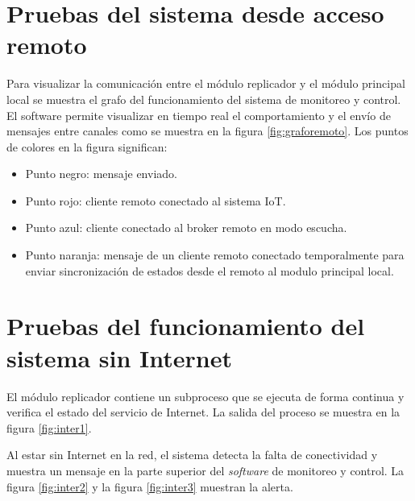 \section{Pruebas del sistema desde acceso remoto}

Para visualizar la comunicación entre el módulo replicador y el módulo principal local se muestra el grafo del funcionamiento del sistema de monitoreo y control. El software permite visualizar en tiempo real el comportamiento y el envío de mensajes entre canales como se muestra en la figura \ref{fig:graforemoto}. Los puntos de colores en la figura significan:

\begin{itemize}
\item Punto negro: mensaje enviado.
\item Punto rojo: cliente remoto conectado al sistema IoT.
\item Punto azul: cliente conectado al broker remoto en modo escucha.
\item Punto naranja: mensaje de un cliente remoto conectado temporalmente para enviar sincronización de estados desde el remoto al modulo principal local. 
\end{itemize}



\section{Pruebas del funcionamiento del sistema sin Internet}

El módulo replicador contiene un subproceso que se ejecuta de forma continua y verifica el estado del servicio de Internet. La salida del proceso se muestra en la figura \ref{fig:inter1}. 

Al estar sin Internet en la red, el sistema detecta la falta de conectividad y muestra un mensaje en la parte superior del \emph{software} de monitoreo y control. La figura \ref{fig:inter2} y la figura \ref{fig:inter3} muestran la alerta.

